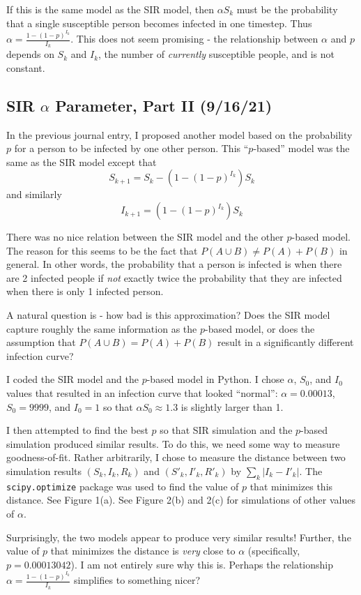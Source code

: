 \documentclass[12pt]{article}
\begin{document}
If this is the same model as the SIR model, then $\alpha S_k$ must be the probability that a single susceptible person becomes infected in one timestep. Thus $\alpha = \frac{1 - (1-p)^{I_k}}{I_k}$. This does not seem promising - the relationship between $\alpha$ and $p$ depends on $S_k$ and $I_k$, the number of \textit{currently} susceptible people, and is not constant.

\subsection{SIR $\alpha$ Parameter, Part II (9/16/21)}
In the previous journal entry, I proposed another model based on the probability $p$ for a person to be infected by one other person. This ``$p$-based'' model was the same as the SIR model except that 
$$S_{k+1} = S_{k} - (1 - (1-p)^{I_k}) S_{k}$$
and similarly
$$I_{k+1} = (1 - (1-p)^{I_k}) S_{k}$$

There was no nice relation between the SIR model and the other $p$-based model. The reason for this seems to be the fact that $P(A \cup B) \neq P(A) + P(B)$ in general. In other words, the probability that a person is infected is when there are 2 infected people if \textit{not} exactly twice the probability that they are infected when there is only 1 infected person.

A natural question is - how bad is this approximation? Does the SIR model capture roughly the same information as the $p$-based model, or does the assumption that $P(A \cup B) = P(A) + P(B)$ result in a significantly different infection curve?

I coded the SIR model and the $p$-based model in Python. I chose $\alpha$, $S_0$, and $I_0$ values that resulted in an infection curve that looked ``normal'': $\alpha = 0.00013$, $S_0 = 9999$, and $I_0 = 1$ so that $\alpha S_0 \approx 1.3$ is slightly larger than 1.

I then attempted to find the best $p$ so that SIR simulation and the $p$-based simulation produced similar results. To do this, we need some way to measure goodness-of-fit. Rather arbitrarily, I chose to measure the distance between two simulation results $(S_k, I_k, R_k)$ and $(S'_k, I'_k, R'_k)$ by $\sum_k \lvert I_k - I'_k \rvert$. The \texttt{scipy.optimize} package was used to find the value of $p$ that minimizes this distance. See Figure 1(a). See Figure 2(b) and 2(c) for simulations of other values of $\alpha$.

Surprisingly, the two models appear to produce very similar results! Further, the value of $p$ that minimizes the distance is \textit{very} close to $\alpha$ (specifically, $p = 0.00013042$). I am not entirely sure why this is. Perhaps the relationship $\alpha = \frac{1 - (1-p)^{I_k}}{I_k}$ simplifies to something nicer?
\end{document}
